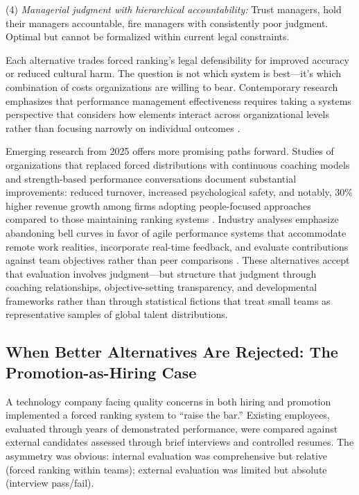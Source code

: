 \documentclass[12pt]{article}
\begin{document}
(4) \emph{Managerial judgment with hierarchical accountability:} Trust managers, hold their managers accountable, fire managers with consistently poor judgment. Optimal but cannot be formalized within current legal constraints.

Each alternative trades forced ranking's legal defensibility for improved accuracy or reduced cultural harm. The question is not which system is best---it's which combination of costs organizations are willing to bear. Contemporary research emphasizes that performance management effectiveness requires taking a systems perspective that considers how elements interact across organizational levels rather than focusing narrowly on individual outcomes \citep{schleicher2018putting}.

Emerging research from 2025 offers more promising paths forward. Studies of organizations that replaced forced distributions with continuous coaching models and strength-based performance conversations document substantial improvements: reduced turnover, increased psychological safety, and notably, 30\% higher revenue growth among firms adopting people-focused approaches compared to those maintaining ranking systems \citep{betterworks2025continuous}. Industry analyses emphasize abandoning bell curves in favor of agile performance systems that accommodate remote work realities, incorporate real-time feedback, and evaluate contributions against team objectives rather than peer comparisons \citep{worxmate2025agile}. These alternatives accept that evaluation involves judgment---but structure that judgment through coaching relationships, objective-setting transparency, and developmental frameworks rather than through statistical fictions that treat small teams as representative samples of global talent distributions.


\subsection{When Better Alternatives Are Rejected: The Promotion-as-Hiring Case}

A technology company facing quality concerns in both hiring and promotion implemented a forced ranking system to ``raise the bar.'' Existing employees, evaluated through years of demonstrated performance, were compared against external candidates assessed through brief interviews and controlled resumes. The asymmetry was obvious: internal evaluation was comprehensive but relative (forced ranking within teams); external evaluation was limited but absolute (interview pass/fail).
\end{document}
